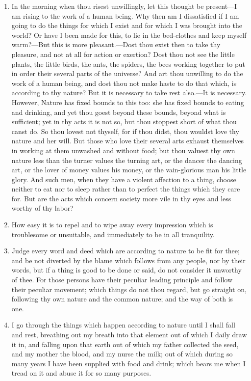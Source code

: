 \begin{enumerate}
\item In the morning when thou risest unwillingly, let this thought be present—I am rising to the work of a human being. Why then am I dissatisfied if I am going to do the things for which I exist and for which I was brought into the world? Or have I been made for this, to lie in the bed-clothes and keep myself warm?—But this is more pleasant.—Dost thou exist then to take thy pleasure, and not at all for action or exertion? Dost thou not see the little plants, the little birds, the ants, the spiders, the bees working together to put in order their several parts of the universe? And art thou unwilling to do the work of a human being, and dost thou not make haste to do that which, is according to thy nature? But it is necessary to take rest also.—It is necessary. However, Nature has fixed bounds to this too: she has fixed bounds to eating and drinking, and yet thou goest beyond these bounds, beyond what is sufficient; yet in thy acts it is not so, but thou stoppest short of what thou canst do. So thou lovest not thyself, for if thou didst, thou wouldst love thy nature and her will. But those who love their several arts exhaust themselves in working at them unwashed and without food; but thou valuest thy own nature less than the turner values the turning art, or the dancer the dancing art, or the lover of money values his money, or the vain-glorious man his little glory. And such men, when they have a violent affection to a thing, choose neither to eat nor to sleep rather than to perfect the things which they care for. But are the acts which concern society more vile in thy eyes and less worthy of thy labor?

\item How easy it is to repel and to wipe away every impression which is troublesome or unsuitable, and immediately to be in all tranquility.

\item Judge every word and deed which are according to nature to be fit for thee; and be not diverted by the blame which follows from any people, nor by their words, but if a thing is good to be done or said, do not consider it unworthy of thee. For those persons have their peculiar leading principle and follow their peculiar movement; which things do not thou regard, but go straight on, following thy own nature and the common nature; and the way of both is one.

\item I go through the things which happen according to nature until I shall fall and rest, breathing out my breath into that element out of which I daily draw it in, and falling upon that earth out of which my father collected the seed, and my mother the blood, and my nurse the milk; out of which during so many years I have been supplied with food and drink; which bears me when I tread on it and abuse it for so many purposes.


\end{enumerate}
